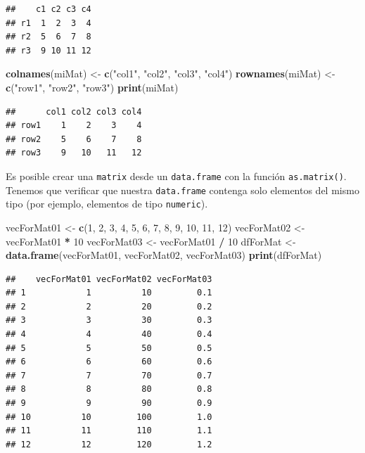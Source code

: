 \documentclass[
]{book}
\newenvironment{Shaded}{\begin{snugshade}}{\end{snugshade}}
\newcommand{\DecValTok}[1]{\textcolor[rgb]{0.00,0.00,0.81}{#1}}
\newcommand{\KeywordTok}[1]{\textcolor[rgb]{0.13,0.29,0.53}{\textbf{#1}}}
\newcommand{\NormalTok}[1]{#1}
\newcommand{\OperatorTok}[1]{\textcolor[rgb]{0.81,0.36,0.00}{\textbf{#1}}}
\newcommand{\StringTok}[1]{\textcolor[rgb]{0.31,0.60,0.02}{#1}}
\begin{document}
\begin{verbatim}
##    c1 c2 c3 c4
## r1  1  2  3  4
## r2  5  6  7  8
## r3  9 10 11 12
\end{verbatim}

\begin{Shaded}
\begin{Highlighting}[]
\KeywordTok{colnames}\NormalTok{(miMat) <-}\StringTok{ }\KeywordTok{c}\NormalTok{(}\StringTok{"col1"}\NormalTok{, }\StringTok{"col2"}\NormalTok{, }\StringTok{"col3"}\NormalTok{, }\StringTok{"col4"}\NormalTok{)}
\KeywordTok{rownames}\NormalTok{(miMat) <-}\StringTok{ }\KeywordTok{c}\NormalTok{(}\StringTok{"row1"}\NormalTok{, }\StringTok{"row2"}\NormalTok{, }\StringTok{"row3"}\NormalTok{)}
\KeywordTok{print}\NormalTok{(miMat)}
\end{Highlighting}
\end{Shaded}

\begin{verbatim}
##      col1 col2 col3 col4
## row1    1    2    3    4
## row2    5    6    7    8
## row3    9   10   11   12
\end{verbatim}

Es posible crear una \texttt{matrix} desde un \texttt{data.frame} con la función \texttt{as.matrix()}. Tenemos que verificar que nuestra \texttt{data.frame} contenga solo elementos del mismo tipo (por ejemplo, elementos de tipo \texttt{numeric}).

\begin{Shaded}
\begin{Highlighting}[]
\NormalTok{vecForMat01 <-}\StringTok{ }\KeywordTok{c}\NormalTok{(}\DecValTok{1}\NormalTok{, }\DecValTok{2}\NormalTok{, }\DecValTok{3}\NormalTok{, }\DecValTok{4}\NormalTok{, }\DecValTok{5}\NormalTok{, }\DecValTok{6}\NormalTok{, }\DecValTok{7}\NormalTok{, }\DecValTok{8}\NormalTok{, }\DecValTok{9}\NormalTok{, }\DecValTok{10}\NormalTok{, }\DecValTok{11}\NormalTok{, }\DecValTok{12}\NormalTok{)}
\NormalTok{vecForMat02 <-}\StringTok{ }\NormalTok{vecForMat01 }\OperatorTok{*}\StringTok{ }\DecValTok{10}
\NormalTok{vecForMat03 <-}\StringTok{ }\NormalTok{vecForMat01 }\OperatorTok{/}\StringTok{ }\DecValTok{10}
\NormalTok{dfForMat <-}\StringTok{ }\KeywordTok{data.frame}\NormalTok{(vecForMat01, vecForMat02, vecForMat03)}
\KeywordTok{print}\NormalTok{(dfForMat)}
\end{Highlighting}
\end{Shaded}

\begin{verbatim}
##    vecForMat01 vecForMat02 vecForMat03
## 1            1          10         0.1
## 2            2          20         0.2
## 3            3          30         0.3
## 4            4          40         0.4
## 5            5          50         0.5
## 6            6          60         0.6
## 7            7          70         0.7
## 8            8          80         0.8
## 9            9          90         0.9
## 10          10         100         1.0
## 11          11         110         1.1
## 12          12         120         1.2
\end{verbatim}
\end{document}
